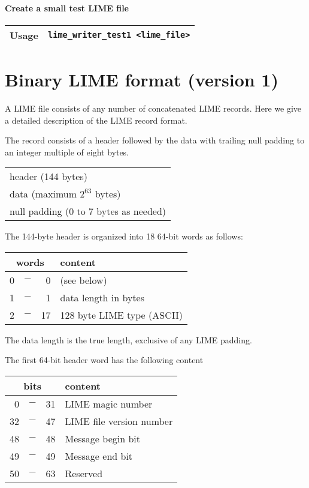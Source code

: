 \documentclass{article}
\begin{document}
\paragraph{Create a small test LIME file}
%
\begin{flushleft}
  \begin{tabular}{|l|l|}
  \hline
  Usage     & \verb|lime_writer_test1 <lime_file>| \\
  \hline
 \end{tabular}
\end{flushleft}
%

\appendix
\section{Binary LIME format (version 1)}

A LIME file consists of any number of concatenated LIME records.  Here
we give a detailed description of the LIME record format.

The record consists of a header followed by the data with trailing
null padding to an integer multiple of eight bytes.

\begin{center}
  \begin{tabular}{|l|}
  \hline
   header (144 bytes) \\
   data (maximum $2^{63}$ bytes) \\
   null padding (0 to 7 bytes as needed) \\
  \hline
  \end{tabular}
\end{center}

The 144-byte header is organized into 18 64-bit words as follows:

\begin{center}
  \begin{tabular}{|rcr|l|}
    \hline
    \multicolumn{3}{|c|}{words} & content \\
    \hline
    0 & $-$ &  0  & (see below) \\
    1 & $-$ &  1  & data length in bytes \\
    2 & $-$ & 17  & 128 byte LIME type (ASCII) \\
    \hline
  \end{tabular}
\end{center}
%
The data length is the true length, exclusive of any LIME padding.

The first 64-bit header word has the following content
%
\begin{center}
  \begin{tabular}{|rcr|l|}
    \hline
    \multicolumn{3}{|c|}{bits}  & content \\
    \hline
       0 & $-$ &  31 & LIME magic number \\
      32 & $-$ &  47 & LIME file version number \\
      48 & $-$ &  48 & Message begin bit \\
      49 & $-$ &  49 & Message end bit \\
      50 & $-$ &  63 & Reserved \\
    \hline
  \end{tabular}
\end{center}
\end{document}
